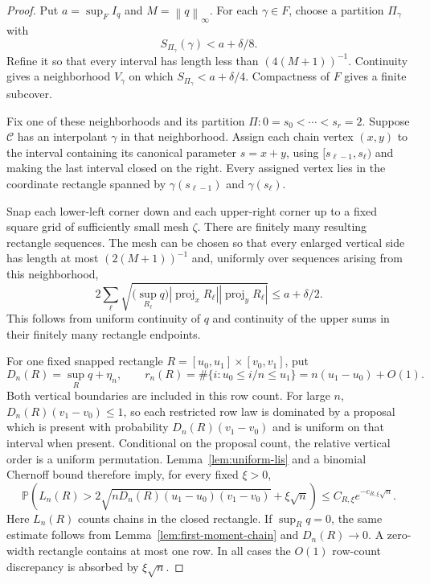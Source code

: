 \documentclass[11pt]{article}
\theoremstyle{remark}
\newcommand{\Pp}{\mathbb P}
\newcommand{\norm}[1]{\left\lVert #1\right\rVert}
\begin{document}
\begin{proof}
Put $a=\sup_F I_q$ and $M=\norm q_\infty$.  For each $\gamma\in F$, choose
a partition $\Pi_\gamma$ with
\[
 S_{\Pi_\gamma}(\gamma)<a+\delta/8.
\]
Refine it so that every interval has length less than $(4(M+1))^{-1}$.
Continuity gives a neighborhood $V_\gamma$ on which
$S_{\Pi_\gamma}<a+\delta/4$.  Compactness of $F$ gives a finite subcover.

Fix one of these neighborhoods and its partition
$\Pi:0=s_0<\cdots<s_r=2$.  Suppose $\mathcal C$ has an interpolant
$\gamma$ in that neighborhood.  Assign each chain vertex $(x,y)$ to the
interval containing its canonical parameter $s=x+y$, using
$[s_{\ell-1},s_\ell)$ and making the last interval closed on the right.
Every assigned vertex lies in the coordinate rectangle spanned by
$\gamma(s_{\ell-1})$ and $\gamma(s_\ell)$.

Snap each lower-left corner down and each upper-right corner up to a fixed
square grid of sufficiently small mesh $\zeta$.  There are finitely many
resulting rectangle sequences.  The mesh can be chosen so that every
enlarged vertical side has length at most $(2(M+1))^{-1}$ and, uniformly
over sequences arising from this neighborhood,
\begin{equation}\label{eq:snapped-upper-sum}
 2\sum_\ell
 \sqrt{\bigl(\sup_{R_\ell}q\bigr)
        |\operatorname{proj}_xR_\ell|
        |\operatorname{proj}_yR_\ell|}
 \le a+\delta/2.
\end{equation}
This follows from uniform continuity of $q$ and continuity of the upper sums
in their finitely many rectangle endpoints.

For one fixed snapped rectangle
$R=[u_0,u_1]\times[v_0,v_1]$, put
\[
 D_n(R)=\sup_Rq+\eta_n,
 \qquad
 r_n(R)=\#\{i:u_0\le i/n\le u_1\}
       =n(u_1-u_0)+O(1).
\]
Both vertical boundaries are included in this row count.  For large $n$,
$D_n(R)(v_1-v_0)\le1$, so each restricted row law is dominated by a proposal
which is present with probability $D_n(R)(v_1-v_0)$ and is uniform on that
interval when present.  Conditional on the proposal count, the relative
vertical order is a uniform permutation.  Lemma~\ref{lem:uniform-lis} and
a binomial Chernoff bound therefore imply, for every fixed $\xi>0$,
\begin{equation}\label{eq:rectangle-upper-tail}
 \Pp\left(
 L_n(R)>
 2\sqrt{nD_n(R)(u_1-u_0)(v_1-v_0)}+\xi\sqrt n
 \right)
 \le C_{R,\xi}e^{-c_{R,\xi}\sqrt n}.
\end{equation}
Here $L_n(R)$ counts chains in the closed rectangle.  If $\sup_Rq=0$, the
same estimate follows from Lemma~\ref{lem:first-moment-chain} and
$D_n(R)\to0$.  A zero-width rectangle contains at most one row.  In all
cases the $O(1)$ row-count discrepancy is absorbed by $\xi\sqrt n$.


\end{proof}
\end{document}
